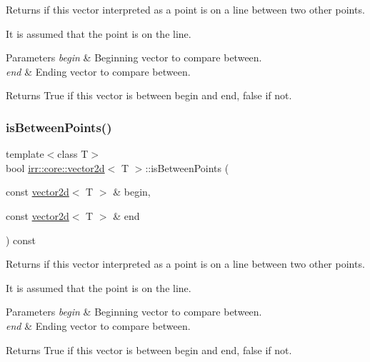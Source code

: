 Returns if this vector interpreted as a point is on a line between two other points. 

It is assumed that the point is on the line. 
\begin{DoxyParams}{Parameters}
{\em begin} & Beginning vector to compare between. \\
\hline
{\em end} & Ending vector to compare between. \\
\hline
\end{DoxyParams}
\begin{DoxyReturn}{Returns}
True if this vector is between begin and end, false if not. 
\end{DoxyReturn}
\mbox{\label{classirr_1_1core_1_1vector2d_aeaf8fc27c46894825b3d84ff47f08a4a}} 
\subsubsection{\texorpdfstring{is\+Between\+Points()}{isBetweenPoints()}\hspace{0.1cm}{\footnotesize\ttfamily [2/2]}}
{\footnotesize\ttfamily template$<$class T$>$ \\
bool \hyperlink{classirr_1_1core_1_1vector2d}{irr\+::core\+::vector2d}$<$ T $>$\+::is\+Between\+Points (\begin{DoxyParamCaption}\item[{const \hyperlink{classirr_1_1core_1_1vector2d}{vector2d}$<$ T $>$ \&}]{begin,  }\item[{const \hyperlink{classirr_1_1core_1_1vector2d}{vector2d}$<$ T $>$ \&}]{end }\end{DoxyParamCaption}) const\hspace{0.3cm}{\ttfamily [inline]}}



Returns if this vector interpreted as a point is on a line between two other points. 

It is assumed that the point is on the line. 
\begin{DoxyParams}{Parameters}
{\em begin} & Beginning vector to compare between. \\
\hline
{\em end} & Ending vector to compare between. \\
\hline
\end{DoxyParams}
\begin{DoxyReturn}{Returns}
True if this vector is between begin and end, false if not. 
\end{DoxyReturn}
\mbox{\label{classirr_1_1core_1_1vector2d_a5d5c360ed4c4fd28d4a42272634b8e55}} 
